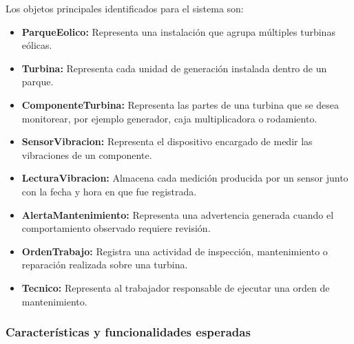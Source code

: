 \documentclass[11pt,a4paper]{article}
\begin{document}
Los objetos principales identificados para el sistema son:

\begin{itemize}
    \item \textbf{ParqueEolico:} Representa una instalación que agrupa múltiples
    turbinas eólicas.

    \item \textbf{Turbina:} Representa cada unidad de generación instalada dentro de
    un parque.

    \item \textbf{ComponenteTurbina:} Representa las partes de una turbina que se
    desea monitorear, por ejemplo generador, caja multiplicadora o rodamiento.

    \item \textbf{SensorVibracion:} Representa el dispositivo encargado de medir las
    vibraciones de un componente.

    \item \textbf{LecturaVibracion:} Almacena cada medición producida por un sensor
    junto con la fecha y hora en que fue registrada.

    \item \textbf{AlertaMantenimiento:} Representa una advertencia generada cuando el
    comportamiento observado requiere revisión.

    \item \textbf{OrdenTrabajo:} Registra una actividad de inspección, mantenimiento
    o reparación realizada sobre una turbina.

    \item \textbf{Tecnico:} Representa al trabajador responsable de ejecutar una orden
    de mantenimiento.
\end{itemize}

\subsubsection{Características y funcionalidades esperadas}
\end{document}
